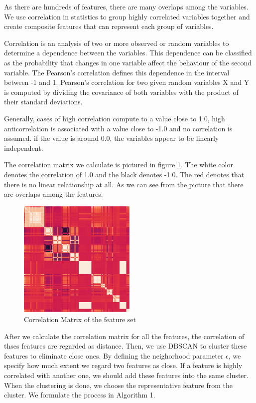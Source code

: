\documentclass[5p]{elsarticle}
\begin{document}
As there are hundreds of features, there are many overlaps among the variables. We use correlation in statistics to group highly correlated variables together and create composite features that can represent each group of variables.

Correlation is an analysis of two or more observed or random variables to determine a dependence between the variables. This dependence can be classified as the probability that changes in one variable affect the behaviour of the second variable. The Pearson’s correlation defines this dependence in the interval between -1 and 1. Pearson’s correlation for two given random variables X and Y is computed by dividing the covariance of both variables with the product of their standard deviations.

Generally, cases of high correlation compute to a value close to 1.0, high anticorrelation is associated with a value close to -1.0 and no correlation is assumed. if the value is around 0.0, the variables appear to be linearly independent. 

The correlation matrix we calculate is pictured in figure \ref{fig:Correlation_matrix}. The white color denotes the correlation of 1.0 and the black denotes -1.0. The red denotes that there is no linear relationship at all. As we can see from the picture that there are overlaps among the features.

\begin{figure}[h]
    \centering
    \includegraphics[width=0.5\textwidth]{Correlation_Matrix.png}
    \caption{Correlation Matrix of the feature set}
    \label{fig:Correlation_matrix}
\end{figure}

After we calculate the correlation matrix for all the features, the correlation of thses features are regarded as distance. Then, we use DBSCAN to cluster these features to eliminate close ones. By defining the neighorhood parameter $\epsilon$, we specify how much extent we regard two features as close. If a feature is highly correlated with another one, we should add these features into the same cluster. When the clustering is done, we choose the representative feature from the cluster. We formulate the process in Algorithm 1.
\end{document}
